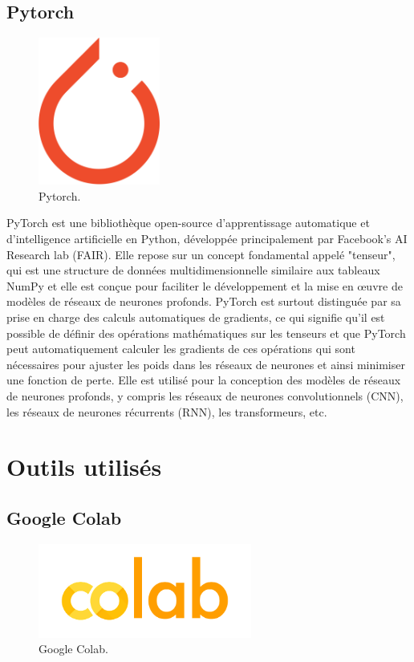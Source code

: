 \subsection{Pytorch}

\begin{figure}[hbt!]
  \centering
  \includegraphics[width=4cm]{images_pfe/pytorch.png}
  \caption{Pytorch.}
  \label{fig:pytorch}
\end{figure}
\FloatBarrier
\medskip

PyTorch est une bibliothèque open-source d'apprentissage automatique et
d'intelligence artificielle en Python, développée principalement par Facebook's
AI Research lab (FAIR). Elle repose sur un concept fondamental appelé
"tenseur", qui est une structure de données multidimensionnelle similaire aux
tableaux NumPy et elle est conçue pour faciliter le développement et la mise en
œuvre de modèles de réseaux de neurones profonds. PyTorch est surtout
distinguée par sa prise en charge des calculs automatiques de gradients, ce qui
signifie qu'il est possible de définir des opérations mathématiques sur les
tenseurs et que PyTorch peut automatiquement calculer les gradients de ces
opérations qui sont nécessaires pour ajuster les poids dans les réseaux de
neurones et ainsi minimiser une fonction de perte. Elle est utilisé pour la
conception des modèles de réseaux de neurones profonds, y compris les réseaux
de neurones convolutionnels (CNN), les réseaux de neurones récurrents (RNN),
les transformeurs, etc.

\section{Outils utilisés}

\subsection{Google Colab}

\begin{figure}[hbt!]
  \centering
  \includegraphics[width=7cm]{images_pfe/colab.png}
  \caption{Google Colab.}
  \label{fig:colab}
\end{figure}
\FloatBarrier
\medskip

